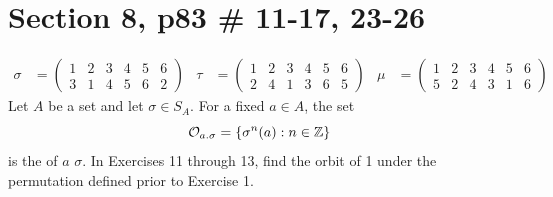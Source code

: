 \documentclass{article}
\newcommand{\assignment}{Section 8, p83 \# 11-17, 23-26}
\begin{document}
\section*{\assignment}

\begin{align*}
    \sigma & = \begin{pmatrix}
        1 & 2 & 3 & 4 & 5 & 6 \\
        3 & 1 & 4 & 5 & 6 & 2
    \end{pmatrix} & \tau & = \begin{pmatrix}
        1 & 2 & 3 & 4 & 5 & 6 \\
        2 & 4 & 1 & 3 & 6 & 5
    \end{pmatrix} & \mu & = \begin{pmatrix}
        1 & 2 & 3 & 4 & 5 & 6 \\
        5 & 2 & 4 & 3 & 1 & 6
    \end{pmatrix}
\end{align*}
Let $A$ be a set and let $\sigma \in S_A$. For a fixed $a \in A$, the set
\[
    \mathcal{O}_{a.\sigma} = \{\sigma^n(a) : n \in \mathbb{Z}\}
\]
is the  of $a$  $\sigma$. In Exercises 11 through 13, find the orbit of 1 under the permutation defined prior to Exercise 1.
\end{document}
